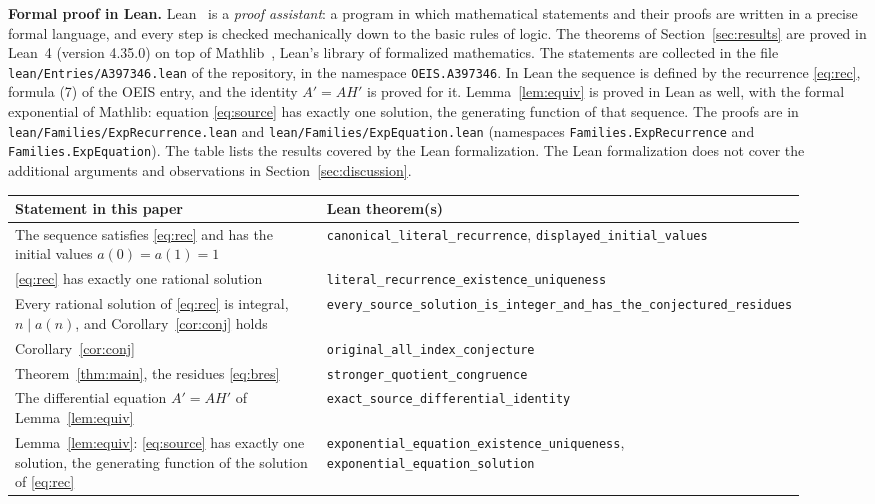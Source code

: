 \documentclass[11pt,a4paper]{article}
\theoremstyle{definition}
\theoremstyle{remark}
\newcommand{\para}[1]{\par\medskip\noindent\textbf{#1}\enspace}
\begin{document}
\para{Formal proof in Lean.}
Lean~\cite{lean} is a \emph{proof assistant}: a program in which mathematical statements and their proofs are written
in a precise formal language, and every step is checked mechanically down to the basic rules of logic. The theorems of Section~\ref{sec:results} are proved in Lean~4 (version 4.35.0) on top of
Mathlib~\cite{mathlib}, Lean's library of formalized mathematics. The statements are collected in the file \texttt{lean/Entries/A397346.lean} of the repository,
in the namespace \texttt{OEIS.A397346}. In Lean the sequence is defined by the recurrence \eqref{eq:rec}, formula (7) of the OEIS entry, and the
identity $A'=AH'$ is proved for it. Lemma~\ref{lem:equiv} is proved in Lean as well, with the formal exponential of
Mathlib: equation \eqref{eq:source} has exactly one solution, the generating function of that sequence. The proofs are in
\texttt{lean/Families/ExpRecurrence.lean} and \texttt{lean/Families/ExpEquation.lean} (namespaces
\texttt{Families.ExpRecurrence} and \texttt{Families.ExpEquation}).
The table lists the results covered by the Lean formalization. The Lean formalization does not cover the additional arguments and observations in Section~\ref{sec:discussion}.
\begin{center}\small\renewcommand{\arraystretch}{1.25}
\begin{tabular}{>{\raggedright\arraybackslash}p{0.52\linewidth}>{\raggedright\arraybackslash}p{0.4\linewidth}}
\toprule
Statement in this paper & Lean theorem(s)\\
\midrule
The sequence satisfies \eqref{eq:rec} and has the initial values $a(0)=a(1)=1$ & \texttt{canonical\_\allowbreak{}literal\_\allowbreak{}recurrence}, \texttt{displayed\_\allowbreak{}initial\_\allowbreak{}values} \\
\eqref{eq:rec} has exactly one rational solution & \texttt{literal\_\allowbreak{}recurrence\_\allowbreak{}existence\_\allowbreak{}uniqueness} \\
Every rational solution of \eqref{eq:rec} is integral, $n\mid a(n)$, and Corollary~\ref{cor:conj} holds & \texttt{every\_\allowbreak{}source\_\allowbreak{}solution\_\allowbreak{}is\_\allowbreak{}integer\_\allowbreak{}and\_\allowbreak{}has\_\allowbreak{}the\_\allowbreak{}conjectured\_\allowbreak{}residues} \\
Corollary~\ref{cor:conj} & \texttt{original\_\allowbreak{}all\_\allowbreak{}index\_\allowbreak{}conjecture} \\
Theorem~\ref{thm:main}, the residues \eqref{eq:bres} & \texttt{stronger\_\allowbreak{}quotient\_\allowbreak{}congruence} \\
The differential equation $A'=AH'$ of Lemma~\ref{lem:equiv} & \texttt{exact\_\allowbreak{}source\_\allowbreak{}differential\_\allowbreak{}identity} \\
Lemma~\ref{lem:equiv}: \eqref{eq:source} has exactly one solution, the generating function of the solution of \eqref{eq:rec} & \texttt{exponential\_\allowbreak{}equation\_\allowbreak{}existence\_\allowbreak{}uniqueness}, \texttt{exponential\_\allowbreak{}equation\_\allowbreak{}solution} \\
\bottomrule
\end{tabular}
\end{center}
\end{document}
